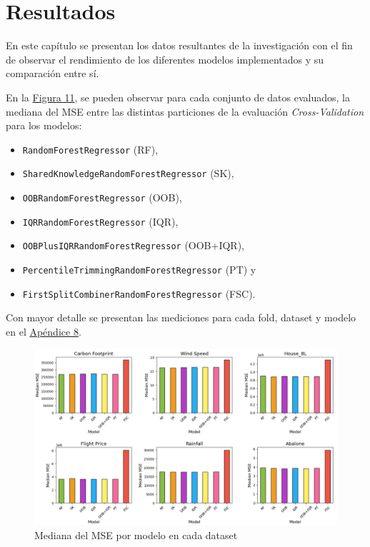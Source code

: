 %
\chapter{Resultados}
\label{ch::capitulo7}

En este capítulo se presentan los datos resultantes de la investigación con el fin de observar el rendimiento de los diferentes modelos implementados y su comparación entre sí. 

En la \hyperref[figure11]{Figura 11}, se pueden observar para cada conjunto de datos evaluados, la mediana del MSE entre las distintas particiones de la evaluación \textit{Cross-Validation} para los modelos:

\begin{itemize}
    \item \texttt{RandomForestRegressor} (RF),
    \item \texttt{SharedKnowledgeRandomForestRegressor} (SK),
    \item \texttt{OOBRandomForestRegressor} (OOB),
    \item \texttt{IQRRandomForestRegressor} (IQR),
    \item \texttt{OOBPlusIQRRandomForestRegressor} (OOB+IQR),
    \item \texttt{PercentileTrimmingRandomForestRegressor} (PT) y
    \item \texttt{FirstSplitCombinerRandomForestRegressor} (FSC).
\end{itemize}

Con mayor detalle se presentan las mediciones para cada fold, dataset y modelo en el \hyperref[appendix8]{Apéndice 8}.

\begin{figure}[h]
\centering
    \includegraphics[width=1\textwidth]{figures/results/comparison_grid.png}
\caption{Mediana del MSE por modelo en cada dataset}
\end{figure}
\label{figure11}

